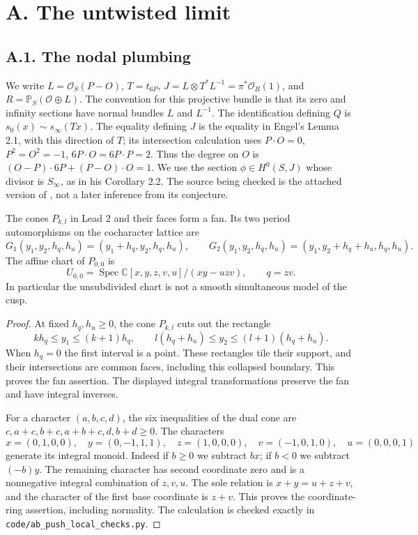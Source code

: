 \section{A. The untwisted limit}
\subsection{A.1. The nodal plumbing}

We write $L=\mathcal O_S(P-O)$, $T=t_{6P}$,
$J=L\otimes T^*L^{-1}=\pi^*\mathcal O_B(1)$, and
$R=\mathbb P_S(\mathcal O\oplus L)$. The convention for this projective
bundle is that its zero and infinity sections have normal bundles
$L$ and $L^{-1}$. The identification defining $Q$ is
$s_0(x)\sim s_\infty(Tx)$. The equality defining $J$ is the equality
in Engel's Lemma 2.1, with this direction of $T$; its intersection
calculation uses $P\cdot O=0$, $P^2=O^2=-1$,
$6P\cdot O=6P\cdot P=2$. Thus the degree on $O$ is
$(O-P)\cdot6P+(P-O)\cdot O=1$. We use the section
$\phi\in H^0(S,J)$ whose divisor is $S_\infty$, as in his
Corollary 2.2. The source being checked is the attached version of
\cite{E26}, not a later inference from its conjecture.

\begin{proposition}[A.1.1; Proved]\label{push:A11}
The cones $P_{k,l}$ in Lead 2 and their faces form a fan. Its two
period automorphisms on the cocharacter lattice are
\[
 G_1(y_1,y_2,h_q,h_u)=(y_1+h_q,y_2,h_q,h_u),\qquad
 G_2(y_1,y_2,h_q,h_u)=(y_1,y_2+h_q+h_u,h_q,h_u).
\]
The affine chart of $P_{0,0}$ is
\[
 U_{0,0}=\operatorname{Spec}\mathbb C[x,y,z,v,u]/(xy-uzv),
 \qquad q=zv.
\]
In particular the unsubdivided chart is not a smooth simultaneous
model of the cusp.
\end{proposition}
\begin{proof}
At fixed $h_q,h_u\geq0$, the cone $P_{k,l}$ cuts out the rectangle
\[
 kh_q\leq y_1\leq(k+1)h_q,\qquad
 l(h_q+h_u)\leq y_2\leq(l+1)(h_q+h_u).
\]
When $h_q=0$ the first interval is a point. These rectangles tile
their support, and their intersections are common faces, including
this collapsed boundary. This proves the fan assertion. The displayed
integral transformations preserve the fan and have integral inverses.

For a character $(a,b,c,d)$, the six inequalities of the dual cone
are $c,a+c,b+c,a+b+c,d,b+d\geq0$. The characters
\[
 x=(0,1,0,0),\quad y=(0,-1,1,1),\quad
 z=(1,0,0,0),\quad v=(-1,0,1,0),\quad u=(0,0,0,1)
\]
generate its integral monoid. Indeed if $b\geq0$ we subtract $b x$;
if $b<0$ we subtract $(-b)y$. The remaining character has second
coordinate zero and is a nonnegative integral combination of $z,v,u$.
The sole relation is $x+y=u+z+v$, and the character of the first
base coordinate is $z+v$. This proves the coordinate-ring assertion,
including normality. The calculation is checked exactly in
\texttt{code/ab\_push\_local\_checks.py}.
\end{proof}


